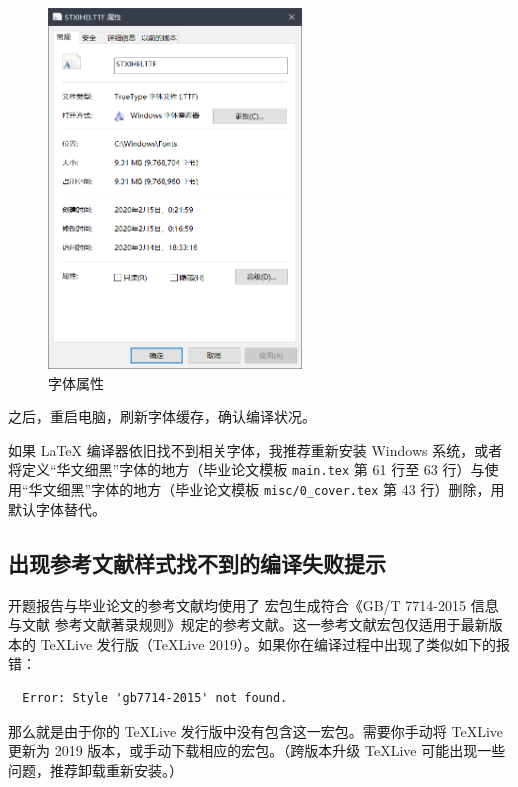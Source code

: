 \begin{figure}[H]
  \centering
  \includegraphics[width=0.6\textwidth]{images/font_property.png}
  \caption{字体属性}
  \label{font_property}
\end{figure}

之后，重启电脑，刷新字体缓存，确认编译状况。

如果 {\LaTeX} 编译器依旧找不到相关字体，我推荐重新安装 Windows 系统，或者将定义“华文细黑”字体的地方（毕业论文模板 \texttt{main.tex} 第 61 行至 63 行）与使用“华文细黑”字体的地方（毕业论文模板 \texttt{misc/0\_cover.tex} 第 43 行）删除，用默认字体替代。

\subsection{出现参考文献样式找不到的编译失败提示}

开题报告与毕业论文的参考文献均使用了 \href{https://github.com/hushidong/biblatex-gb7714-2015}{\color{RoyalBlue}{biblatex-gb7714-2015}} 宏包生成符合《GB/T 7714-2015 信息与文献 参考文献著录规则》规定的参考文献。这一参考文献宏包仅适用于最新版本的 \TeX Live 发行版（\TeX Live 2019）。如果你在编译过程中出现了类似如下的报错：

\begin{verbatim}
  Error: Style 'gb7714-2015' not found.
\end{verbatim}

那么就是由于你的 \TeX Live 发行版中没有包含这一宏包。需要你手动将 \TeX Live 更新为 2019 版本，或手动下载相应的宏包。（跨版本升级 \TeX Live 可能出现一些问题，推荐卸载重新安装。）

